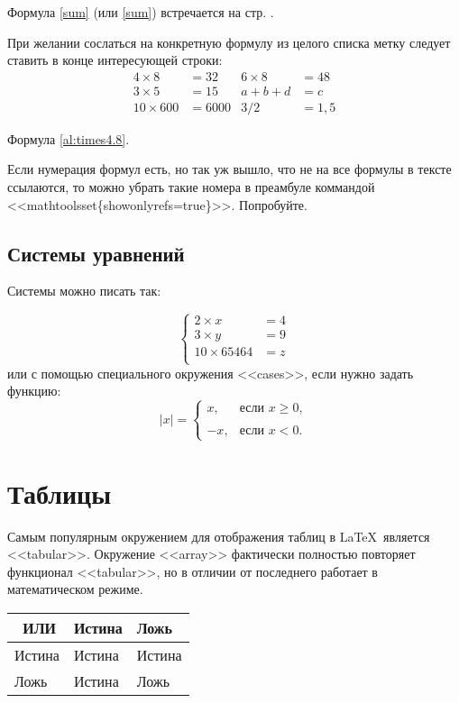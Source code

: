\documentclass[a4paper,12pt]{article} %
\begin{document}
Формула \eqref{sum} (или \ref{sum}) встречается на стр. \pageref{sum}.


При желании сослаться на конкретную формулу из целого списка метку следует ставить в конце интересующей строки:
\begin{align} %
	4\times 8 &= 32 & 6\times 8 &= 48 \label{al:times4.8} \\
	3\times 5 &= 15 & a+b+d &= c\\
	10 \times 600 &= 6000 & 3/2&=1,5
\end{align}

Формула \eqref{al:times4.8}.

Если нумерация формул есть, но так уж вышло, что не на все формулы в тексте ссылаются, то можно убрать такие номера в преамбуле коммандой <<mathtoolsset\{showonlyrefs=true\}>>. Попробуйте.


\subsection{Системы уравнений}

Системы можно писать так:

\[
	\left\{
		\begin{aligned}
			2\times x &= 4  \\
			3\times y &= 9\\
			10 \times 65464 &= z\\
		\end{aligned}
	\right.
\]
или с помощью специального окружения <<cases>>, если нужно задать функцию:
\[
	|x|=\begin{cases} %
		x, &\text{если }  x \ge 0, \\
		\\
		-x, &\text{если } x<0.
	\end{cases}
\]


\section{Таблицы}

Самым популярным окружением для отображения таблиц в \LaTeX \ является <<tabular>>.
Окружение <<array>> фактически полностью повторяет функционал <<tabular>>, но в отличии от последнего работает в математическом режиме.

\begin{tabular}{l|ll|} %
	\textbf{\ ИЛИ} & Истина & Ложь \\[2mm]\hline %
	Истина & Истина & Истина \\
	Ложь & Истина & Ложь
\end{tabular}
\end{document}
